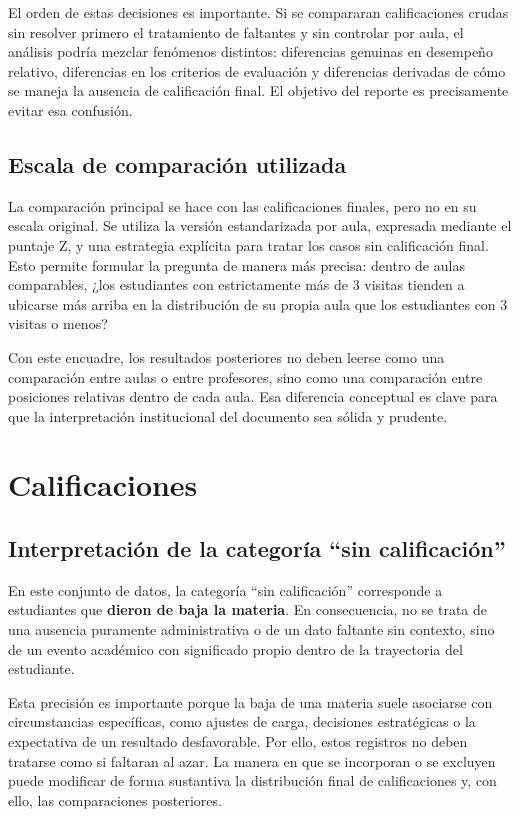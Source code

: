\documentclass[10pt,letterpaper]{article} %
\numberwithin{figure}{subsection}
\begin{document}
El orden de estas decisiones es importante. Si se compararan calificaciones crudas sin resolver primero el tratamiento de faltantes y sin controlar por aula, el análisis podría mezclar fenómenos distintos: diferencias genuinas en desempeño relativo, diferencias en los criterios de evaluación y diferencias derivadas de cómo se maneja la ausencia de calificación final. El objetivo del reporte es precisamente evitar esa confusión.

\subsection{Escala de comparación utilizada}
La comparación principal se hace con las calificaciones finales, pero no en su escala original. Se utiliza la versión estandarizada por aula, expresada mediante el puntaje Z, y una estrategia explícita para tratar los casos sin calificación final. Esto permite formular la pregunta de manera más precisa: dentro de aulas comparables, ¿los estudiantes con estrictamente más de 3 visitas tienden a ubicarse más arriba en la distribución de su propia aula que los estudiantes con 3 visitas o menos?

Con este encuadre, los resultados posteriores no deben leerse como una comparación entre aulas o entre profesores, sino como una comparación entre posiciones relativas dentro de cada aula. Esa diferencia conceptual es clave para que la interpretación institucional del documento sea sólida y prudente.



\FloatBarrier
\section{Calificaciones}

\subsection{Interpretación de la categoría ``sin calificación''}
En este conjunto de datos, la categoría ``sin calificación'' corresponde a estudiantes que \textbf{dieron de baja la materia}. En consecuencia, no se trata de una ausencia puramente administrativa o de un dato faltante sin contexto, sino de un evento académico con significado propio dentro de la trayectoria del estudiante.

Esta precisión es importante porque la baja de una materia suele asociarse con circunstancias específicas, como ajustes de carga, decisiones estratégicas o la expectativa de un resultado desfavorable. Por ello, estos registros no deben tratarse como si faltaran al azar. La manera en que se incorporan o se excluyen puede modificar de forma sustantiva la distribución final de calificaciones y, con ello, las comparaciones posteriores.
\end{document}
